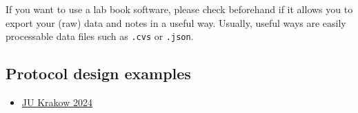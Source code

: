\noindent If you want to use a lab book software, please check beforehand if it allows you to export your (raw) data and notes in a useful way.  Usually, useful ways are easily processable data files such as \texttt{.cvs} or \texttt{.json}.  \\ \newline

\subsection*{Protocol design examples}
\begin{itemize}
    \item \href{https://static.igem.wiki/teams/5087/pics/protocols/rna-purification.pdf}{JU Krakow 2024}
\end{itemize}

